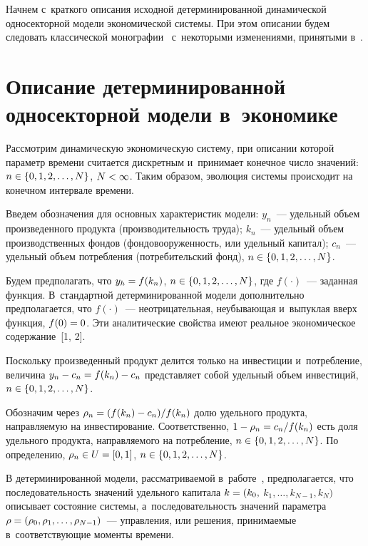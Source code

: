 \begin{multicols}{2}
{}
     
     Начнем с~краткого описания исходной детерминированной динамической 
односекторной модели экономической сис\-те\-мы. При этом описании будем 
следовать классической монографии~\cite{1-sh} с~некоторыми изменениями, 
принятыми в~\cite{8-sh}.
     
\section{Описание детерминированной односекторной модели 
в~экономике}

\vspace*{-4pt}

     Рассмотрим динамическую экономическую сис\-те\-му, при описании которой 
параметр времени считается дискретным и~принимает конечное чис\-ло значений: 
$n\hm\in \{0,1,2,\ldots , N\}$, $N\hm<\infty$. Таким образом, эволюция сис\-те\-мы 
происходит на конечном интервале времени.
     
     Введем обозначения для основных характеристик модели: $y_n$~--- 
удельный объем произведенного продукта (производительность труда);  $k_n$~--- 
удельный объем производственных фондов (фондовооруженность, или удельный 
капитал); $c_n$~--- удельный объем потребления (потребительский фонд), $n\hm\in 
\{0,1,2,\ldots , N\}$.
     
     Будем предполагать, что $y_h\hm= f(k_n)$, $n\hm\in \{ 0,1,2,\ldots , N\}$, где 
$f(\cdot)$~--- заданная функция. В~стандартной детерминированной модели 
дополнительно предполагается, что $f(\cdot)$~--- неотрицательная, неубывающая 
и~выпуклая вверх функция, $f(0)\hm=0$. Эти аналитические свойства имеют 
реальное экономическое содержание~[1, 2].
     
     Поскольку произведенный продукт делится только на инвестиции 
и~потребление, величина $y_n\hm- c_n\hm= f(k_n)\hm - c_n$ представляет собой 
удельный объем инвестиций, $n\hm\in \{0,1,2,\ldots , N\}$.
     
     Обозначим через $\rho_n\hm= (f(k_n)\hm- c_n)/f(k_n)$ долю удельного 
продукта, направляемую на инвестирование. Соответственно, $1\hm- \rho_n\hm= 
c_n/f(k_n)$ есть доля удельного продукта, направляемого на потребление, $n\hm\in 
\{0,1,2,\ldots , N\}$. По определению, $\rho_n \hm\in U\hm= [0,1]$, $n\hm\in 
\{0,1,2,\ldots , N\}$.
     
     В детерминированной модели, рас\-смат\-ри\-ва\-емой в~работе~\cite{8-sh}, 
предполагается, что по\-сле\-до\-ва\-тель\-ность значений удельного капитала $k\hm= (k_0,$\linebreak 
$k_1, \ldots , k_{N-1}, k_N)$ описывает состояние сис\-те\-мы, а~по\-сле\-до\-ва\-тель\-ность 
значений па\-ра\-мет\-ра $\rho \hm= (\rho_0, \rho_1, \ldots , \rho_{N-1})$~--- управ\-ле\-ния, 
или решения, при\-ни\-ма\-емые в~соответствующие моменты вре\-мени.
{

}
\end{multicols}
